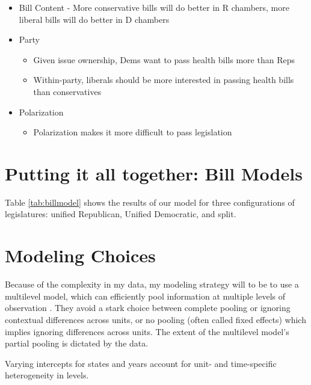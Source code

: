 \documentclass[
  oneside]{book}
\providecommand{\tightlist}{%
  \setlength{\itemsep}{0pt}\setlength{\parskip}{0pt}}
\begin{document}
\begin{itemize}
\tightlist
\item
  Bill Content
  - More conservative bills will do better in R chambers, more liberal bills will do better in D chambers
\item
  Party

  \begin{itemize}
  \tightlist
  \item
    Given issue ownership, Dems want to pass health bills more than Reps
  \item
    Within-party, liberals should be more interested in passing health bills than conservatives
  \end{itemize}
\item
  Polarization

  \begin{itemize}
  \tightlist
  \item
    Polarization makes it more difficult to pass legislation
  \end{itemize}
\end{itemize}

\hypertarget{putting-it-all-together-bill-models}{%
\section{Putting it all together: Bill Models}\label{putting-it-all-together-bill-models}}

Table \ref{tab:billmodel} shows the results of our model for three configurations of legislatures: unified Republican, Unified Democratic, and split.

\hypertarget{modeling-choices}{%
\section{Modeling Choices}\label{modeling-choices}}

Because of the complexity in my data, my modeling strategy will to be to use a multilevel model, which can efficiently pool information at multiple levels of observation \citep{Raudenbush:2002, Gelman:2006}. They avoid a stark choice between complete pooling or ignoring contextual differences across units, or no pooling (often called fixed effects) which implies ignoring differences across units. The extent of the multilevel model's partial pooling is dictated by the data.

Varying intercepts for states and years account for unit- and time-specific heterogeneity in levels.
\end{document}
